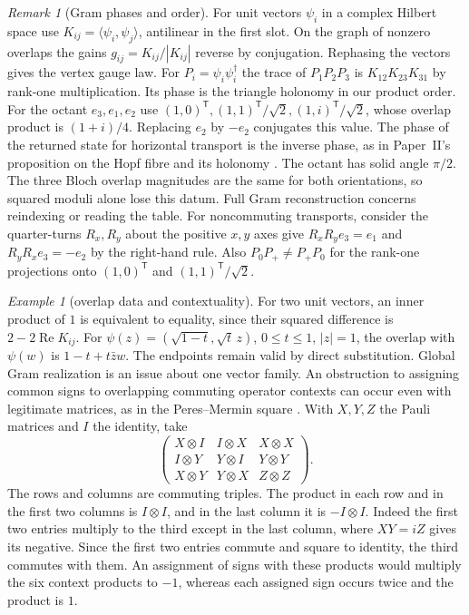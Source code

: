 \documentclass[11pt,reqno]{amsart}
\theoremstyle{definition}
\theoremstyle{remark}
\newtheorem{remark}[theorem]{Remark}
\newtheorem{example}[theorem]{Example}
\numberwithin{equation}{section}
\begin{document}
\begin{remark}[Gram phases and order]\label{m1:phase}
For unit vectors \(\psi_i\) in a complex Hilbert space use
\(K_{ij}=\langle\psi_i,\psi_j\rangle\), antilinear in the first
slot. On the graph of nonzero overlaps the gains
\(g_{ij}=K_{ij}/|K_{ij}|\) reverse by conjugation. Rephasing
the vectors gives the vertex gauge law. For
\(P_i=\psi_i\psi_i^\dagger\) the trace of \(P_1P_2P_3\) is
\(K_{12}K_{23}K_{31}\) by rank-one multiplication. Its phase
is the triangle holonomy in our product order. For the octant
\(e_3,e_1,e_2\) use
\((1,0)^{\mathsf T},(1,1)^{\mathsf T}/\sqrt2,
(1,i)^{\mathsf T}/\sqrt2\), whose overlap product is \((1+i)/4\).
Replacing \(e_2\) by \(-e_2\) conjugates this value.
The phase of the returned state for horizontal transport is the
inverse phase, as in Paper~II's proposition on the Hopf fibre and
its holonomy \cite{Companion,MS93}. The octant has solid angle
\(\pi/2\). The three Bloch overlap magnitudes are the same for
both orientations, so squared moduli alone lose this datum.
Full Gram reconstruction concerns reindexing or reading the
table. For noncommuting transports, consider the quarter-turns
\(R_x,R_y\) about the positive \(x,y\) axes give \(R_xR_y e_3=e_1\) and
\(R_yR_x e_3=-e_2\) by the right-hand rule.
Also \(P_0 P_+\ne P_+P_0\) for the rank-one projections onto
\((1,0)^{\mathsf T}\) and \((1,1)^{\mathsf T}/\sqrt2\).
\end{remark}

\begin{example}[overlap data and contextuality]\label{m1:overlap-boundaries}
For two unit vectors, an inner product of \(1\) is equivalent
to equality, since their squared difference is
\(2-2\operatorname{Re}K_{ij}\). For
\(\psi(z)=(\sqrt{1-t},\sqrt t\,z)\), \(0\le t\le1\),
\(|z|=1\), the overlap with \(\psi(w)\) is
\(1-t+t\bar z w\). The endpoints remain valid by direct
substitution.
Global Gram realization is an issue about one vector family.
An obstruction to assigning common signs to overlapping
commuting operator contexts can occur even with legitimate
matrices, as in the Peres--Mermin square \cite{m1:Mermin}.
With \(X,Y,Z\) the Pauli matrices and \(I\) the
identity, take
\[
 \begin{pmatrix}
 X\otimes I&I\otimes X&X\otimes X\\
 I\otimes Y&Y\otimes I&Y\otimes Y\\
 X\otimes Y&Y\otimes X&Z\otimes Z
 \end{pmatrix}.
\]
The rows and columns are commuting triples. The product in
each row and in the first two columns is \(I\otimes I\), and
in the last column it is \(-I\otimes I\). Indeed the first
two entries multiply to the third except in the last column,
where \(XY=iZ\) gives its negative. Since the first two entries
commute and square to identity, the third commutes with them.
An assignment of signs with these products would multiply the
six context products to \(-1\), whereas each assigned sign
occurs twice and the product is \(1\).
\end{example}
\end{document}
